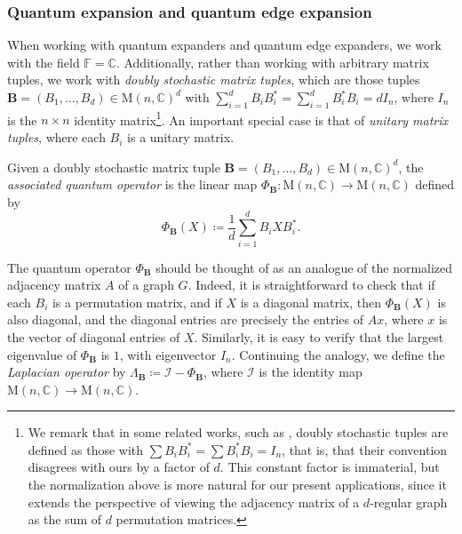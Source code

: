 \documentclass{toc}
\theoremstyle{plain}
\numberwithin{equation}{section}
\theoremstyle{definition}
\newcommand{\F}{\mathbb{F}}
\newcommand{\bC}{\mathbb{C}}
\newcommand{\M}{\mathrm{M}}
\newcommand{\tuple}[1]{\mathbf{#1}}
\newcommand{\vB}{\tuple{B}}
\begin{document}
\subsubsection{Quantum expansion and quantum edge expansion}
When working with quantum expanders and quantum edge expanders, we work with the field $\F=\bC$. Additionally, rather than working with arbitrary matrix tuples, we work with \emph{doubly stochastic matrix tuples}, which are those tuples $\vB=(B_1,\dots,B_d) \in \M(n,\bC)^d$ with $\sum_{i=1}^d B_i B_i^* = \sum_{i=1}^d B_i^* B_i=dI_n$, where $I_n$ is the $n\times n$ identity matrix\footnote{We remark that in some related works, such as \cite{GGOW16,Gur04}, doubly stochastic tuples are defined as those with $\sum B_i B_i^*=\sum B_i^* B_i=I_n$, that is, that their convention disagrees with ours by a factor of $d$. This constant factor is immaterial, but the normalization above is more natural for our present applications, since it extends the perspective of viewing the adjacency matrix of a $d$-regular graph as the sum of $d$ permutation matrices.}. An important special case is that of \emph{unitary matrix tuples}, where each $B_i$ is a unitary matrix.

\begin{definition}
    Given a doubly stochastic matrix tuple $\vB=(B_1,\dots,B_d) \in \M(n,\bC)^d$, the \emph{associated quantum operator} is the linear map $\Phi_\vB:\M(n,\bC) \to \M(n,\bC)$ defined by
    \[
        \Phi_\vB (X) \coloneqq \frac 1d \sum_{i=1}^d B_i X B_i^*.
    \]
\end{definition}
The quantum operator $\Phi_\vB$ should be thought of as an analogue of the normalized adjacency matrix $A$ of a graph $G$. Indeed, it is straightforward to check that if each $B_i$ is a permutation matrix, and if $X$ is a diagonal matrix, then $\Phi_\vB(X)$ is also diagonal, and the diagonal entries are precisely the entries of $Ax$, where $x$ is the vector of diagonal entries of $X$. Similarly, it is easy to verify that the largest eigenvalue of $\Phi_\vB$ is $1$, with eigenvector $I_n$. Continuing the analogy, we  define the \emph{Laplacian operator} by $\Lambda_\vB \coloneqq \mathcal{I}- \Phi_\vB$, where $\mathcal{I}$ is the identity map $\M(n,\bC) \to \M(n,\bC)$.
\end{document}
